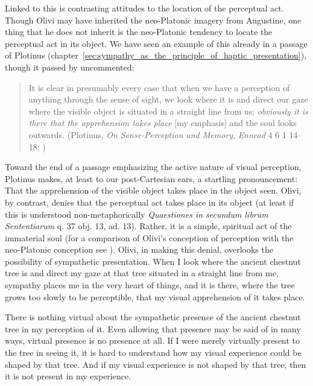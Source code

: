 Linked to this is contrasting attitudes to the location of the perceptual act. Though Olivi may have inherited the neo-Platonic imagery from Augustine, one thing that he does not inherit is the neo-Platonic tendency to locate the perceptual act in its object. We have seen an example of this already in a passage of Plotinus  (chapter~\ref{sec:sympathy_as_the_principle_of_haptic_presentation}), though it passed by uncommented: 
\begin{quote}
	It is clear in presumably every case that when we have a perception of anything through the sense of sight, we look where it is and direct our gaze where the visible object is situated in a straight line from us; \emph{obviously it is there that the apprehension takes place} [my emphasis] and the soul looks outwards. (Plotinus, \emph{On Sense-Perception and Memory}, \emph{Ennead} 4 6 1 14--18; \citealt[321]{Armstrong:1984aa})
\end{quote}
Toward the end of a passage emphasizing the active nature of visual perception, Plotinus makes, at least to our post-Cartesian ears, a startling pronouncement: That the apprehension of the visible object takes place in the object seen. Olivi, by contrast, denies that the perceptual act takes place in its object (at least if this is understood non-metaphorically \emph{Quaestiones in secundum librum Sententiarum} q. 37 obj. 13, ad. 13). Rather, it is a simple, spiritual act of the immaterial soul (for a comparison of Olivi's conception of perception with the neo-Platonic conception see \citealt[151]{Toivanen:2013ul}). Olivi, in making this denial, overlooks the possibility of sympathetic presentation. When I look where the ancient chestnut tree is and direct my gaze at that tree situated in a straight line from me, sympathy places me in the very heart of things, and it is there, where the tree grows too slowly to be perceptible, that my visual apprehension of it takes place.

There is nothing virtual about the sympathetic presence of the ancient chestnut tree in my perception of it. Even allowing that presence may be said of in many ways, virtual presence is no presence at all. If I were merely virtually present to the tree in seeing it, it is hard to understand how my visual experience could be shaped by that tree. And if my visual experience is not shaped by that tree, then it is not present in my experience.

